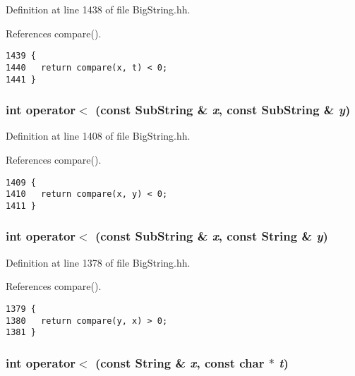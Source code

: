 Definition at line 1438 of file Big\-String.hh.

References compare().



\footnotesize\begin{verbatim}1439 {
1440   return compare(x, t) < 0; 
1441 }
\end{verbatim}\normalsize 
{}
\subsubsection{\setlength{\rightskip}{0pt plus 5cm}int operator$<$ (const {\bf Sub\-String} \& {\em x}, const {\bf Sub\-String} \& {\em y})\hspace{0.3cm}{\tt  [inline]}}\label{BigString_8hh_a114}




Definition at line 1408 of file Big\-String.hh.

References compare().



\footnotesize\begin{verbatim}1409 {
1410   return compare(x, y) < 0;
1411 }
\end{verbatim}\normalsize 
{}
\subsubsection{\setlength{\rightskip}{0pt plus 5cm}int operator$<$ (const {\bf Sub\-String} \& {\em x}, const {\bf String} \& {\em y})\hspace{0.3cm}{\tt  [inline]}}\label{BigString_8hh_a108}




Definition at line 1378 of file Big\-String.hh.

References compare().



\footnotesize\begin{verbatim}1379 {
1380   return compare(y, x) > 0;
1381 }
\end{verbatim}\normalsize 
{}
\subsubsection{\setlength{\rightskip}{0pt plus 5cm}int operator$<$ (const {\bf String} \& {\em x}, const char $\ast$ {\em t})\hspace{0.3cm}{\tt  [inline]}}\label{BigString_8hh_a102}




